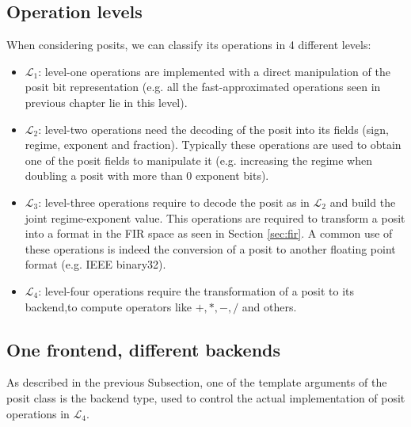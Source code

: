 \subsection{Operation levels}

When considering posits, we can classify its operations in 4 different levels:

\begin{itemize}
    \item $\mathcal{L}_1$: level-one operations are implemented with a direct manipulation of the posit bit representation (e.g. all the fast-approximated operations seen in previous chapter lie in this level).
    \item $\mathcal{L}_2$: level-two operations need the decoding of the posit into its fields (sign, regime, exponent and fraction). Typically these operations are used to obtain one of the posit fields to manipulate it (e.g. increasing the regime when doubling a posit with more than 0 exponent bits).
    \item $\mathcal{L}_3$: level-three operations require to decode the posit as in $\mathcal{L}_2$ and build the joint regime-exponent value. This operations are required to transform a posit into a format in the FIR space as seen in Section \ref{sec:fir}. A common use of these operations is indeed the conversion of a posit to another floating point format (e.g. IEEE binary32).
    \item $\mathcal{L}_4$: level-four operations require the transformation of a posit to its backend,to compute operators like $+,*,-,/$ and others.
\end{itemize}

\subsection{One frontend, different backends}

As described in the previous Subsection, one of the template arguments of the posit class is the backend type, used to control the actual implementation of posit operations in $\mathcal{L}_4$.

